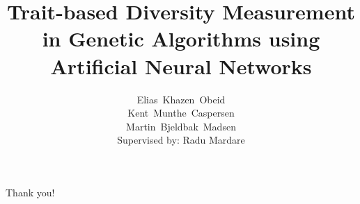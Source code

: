 \documentclass[xcolor=pdftex]{beamer}
\title{Trait-based Diversity Measurement in Genetic Algorithms using Artificial Neural Networks}
\author{%
  Elias~Khazen~Obeid\\
  Kent~Munthe~Caspersen\\
  Martin~Bjeldbak~Madsen\\
  {\small Supervised by: Radu Mardare}
}
\institute{%
  Department of Computer Science\\
  Aalborg University
}
\date{\formatdate{23}{6}{2014}}
\begin{document}
{%
\frame{\titlepage}
}





\begin{frame}[plain,c]
  \begin{center}
    \Huge Thank you!
  \end{center}
\end{frame}
\end{document}

